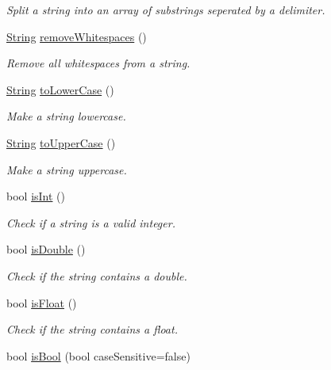 \begin{DoxyCompactItemize}
\begin{DoxyCompactList}\small\item\em Split a string into an array of substrings seperated by a delimiter. \end{DoxyCompactList}\item 
\hyperlink{class_rad_j_a_v_1_1_string}{String} \hyperlink{class_rad_j_a_v_1_1_string_ab0343311b565d55201e97980f29c694d}{remove\+Whitespaces} ()
\begin{DoxyCompactList}\small\item\em Remove all whitespaces from a string. \end{DoxyCompactList}\item 
\hyperlink{class_rad_j_a_v_1_1_string}{String} \hyperlink{class_rad_j_a_v_1_1_string_a7b680e0853e2e221a7728b224ef3f2fe}{to\+Lower\+Case} ()
\begin{DoxyCompactList}\small\item\em Make a string lowercase. \end{DoxyCompactList}\item 
\hyperlink{class_rad_j_a_v_1_1_string}{String} \hyperlink{class_rad_j_a_v_1_1_string_a02e8c3b12ea21ce39d861050ee02627a}{to\+Upper\+Case} ()
\begin{DoxyCompactList}\small\item\em Make a string uppercase. \end{DoxyCompactList}\item 
bool \hyperlink{class_rad_j_a_v_1_1_string_a8f4fec14c1752e3edb811a6e6f9c99ce}{is\+Int} ()
\begin{DoxyCompactList}\small\item\em Check if a string is a valid integer. \end{DoxyCompactList}\item 
bool \hyperlink{class_rad_j_a_v_1_1_string_a51e463c671c993ce10184f68dac050d0}{is\+Double} ()
\begin{DoxyCompactList}\small\item\em Check if the string contains a double. \end{DoxyCompactList}\item 
bool \hyperlink{class_rad_j_a_v_1_1_string_a3fdf5f2aef734fffa2d23964668641be}{is\+Float} ()
\begin{DoxyCompactList}\small\item\em Check if the string contains a float. \end{DoxyCompactList}\item 
bool \hyperlink{class_rad_j_a_v_1_1_string_a07cb003b91b01e8dd78a7b534bdad243}{is\+Bool} (bool case\+Sensitive=false)

\end{DoxyCompactItemize}
